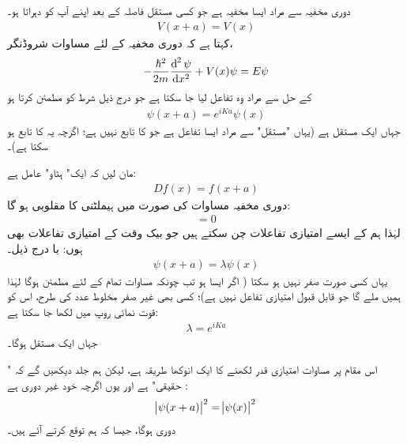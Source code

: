 دوری مخفیہ سے مراد ایسا مخفیہ ہے جو کسی مستقل فاصلہ  کے بعد اپنے آپ کو  دہراتا ہو۔  
\begin{align}\label{مساوات_متماثل_دوری_مخفیہ_کنگھی}
	V(x+a) = V(x)
\end{align}
 کہتا ہے کہ دوری مخفیہ کے لئے مساوات شروڈنگر،
\begin{align}
	-\frac{\hslash^{2}}{2m}\frac{\dif^{\,2}\psi}{\dif x^{2}} +V(x)\psi = E\psi
\end{align}
کے حل سے مراد وہ تفاعل لیا جا سکتا ہے جو درج ذیل شرط کو مطمئن کرتا ہو
\begin{align}\label{مساوات_متماثل_اگلا}
	\psi(x+a) = e^{iKa}\psi(x)
\end{align}
جہاں  ایک مستقل ہے (یہاں "مستقل" سے مراد ایسا تفاعل ہے جو  کا تابع نہیں ہے؛  اگرچہ یہ  کا تابع ہو سکتا ہے)۔

 مان لیں کہ   ایک" ہٹاو"  عامل ہے:
\begin{align}
	Df(x) = f(x+a)
\end{align}
دوری مخفیہ مساوات   کی صورت میں  ہیملٹنی کا  مقلوبی  ہو گا:
\begin{align}
	[D, H] = 0
\end{align}
لہٰذا ہم  کے ایسے امتیازی تفاعلات چن سکتے ہیں جو بیک وقت  کے امتیازی تفاعلات بھی ہوں: یا درج ذیل۔
\begin{align}\label{مساوات_متماثل_دوری_تفاعل_الف}
	\psi(x+a) = \lambda\psi(x)
\end{align}
یہاں  کسی صورت صفر نہیں ہو سکتا ( اگر  ایسا  ہو تب چونکہ مساوات   تمام  کے لئے مطمئن ہوگا لہٰذا ہمیں  ملے گا جو قابل قبول امتیازی تفاعل نہیں ہے)؛  کسی بھی غیر صفر  مخلوط عدد کی طرح،  اس کو قوت نمائی روپ میں لکھا جا سکتا ہے: 
\begin{align}\label{مساوت_متماثل_قوت_نما_مستقل}
	\lambda = e^{iKa}
\end{align}
جہاں  ایک مستقل ہوگا۔

اس مقام پر مساوات   امتیازی قدر  لکھنے کا ایک انوکھا طریقہ ہے،  لیکن ہم جلد دیکھیں گے کہ " حقیقی" ہے اور یوں اگرچہ  خود غیر دوری ہے :
\begin{align}\label{مساوات_متماثل_آخری_مقام_تفاعل_ابتدائی}
	\abs{\psi(x+a)}^{2} = \abs{\psi(x)}^{2}
\end{align}
دوری ہوگا،  جیسا کہ ہم توقع کرتے  آئے ہیں۔


